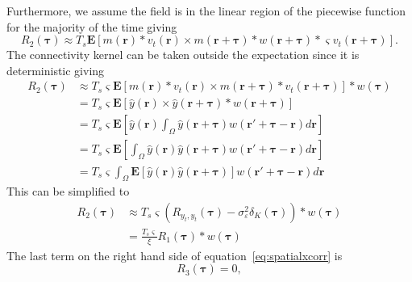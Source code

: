 \documentclass[]{article}
\begin{document}
Furthermore, we assume the field is in the linear region of the piecewise function for the majority of the time giving
\begin{equation}
	R_2(\boldsymbol{\tau}) \approx T_s\mathbf{E}\left[ m\left(\mathbf{r}\right) \ast v_t\left(\mathbf{r}\right) \times m\left(\mathbf{r}+\boldsymbol{\tau}\right) \ast w\left(\mathbf{r}+\boldsymbol{\tau}\right) \ast \varsigma v_t\left(\mathbf{r}+\boldsymbol{\tau}\right) \right].
\end{equation}
The connectivity kernel can be taken outside the expectation since it is deterministic giving
\begin{align}
	R_2(\boldsymbol{\tau}) &\approx T_s \varsigma \mathbf{E}\left[ m\left(\mathbf{r}\right) \ast v_t\left(\mathbf{r}\right) \times m\left(\mathbf{r}+\boldsymbol{\tau}\right)  \ast  v_t\left(\mathbf{r}+\boldsymbol{\tau}\right) \right] \ast w\left(\boldsymbol{\tau}\right) \\
	&= T_s \varsigma \mathbf{E}\left[ \hat{y}\left(\mathbf{r}\right) \times \hat{y}\left(\mathbf{r}+\boldsymbol{\tau}\right) \ast w\left(\mathbf{r}+\boldsymbol{\tau}\right)\right] \\
	&= T_s \varsigma \mathbf{E}\left[ \hat{y}\left(\mathbf{r}\right)  \int_{\Omega}\hat{y}\left(\mathbf{r}+\boldsymbol{\tau}\right) w\left(\mathbf{r}'+\boldsymbol{\tau}-\mathbf{r}\right) d\mathbf{r} \right] \\
	&= T_s \varsigma \mathbf{E}\left[  \int_{\Omega}\hat{y}\left(\mathbf{r}\right)\hat{y}\left(\mathbf{r}+\boldsymbol{\tau}\right) w\left(\mathbf{r}'+\boldsymbol{\tau}-\mathbf{r}\right) d\mathbf{r} \right] \\
	&= T_s \varsigma   \int_{\Omega}\mathbf{E}\left[\hat{y}\left(\mathbf{r}\right)\hat{y}\left(\mathbf{r}+\boldsymbol{\tau}\right) \right] w\left(\mathbf{r}'+\boldsymbol{\tau}-\mathbf{r}\right) d\mathbf{r}
\end{align}
This can be simplified to
\begin{align}
	R_2(\boldsymbol{\tau}) &\approx T_s \varsigma \left( R_{y_{t},y_{t}}(\boldsymbol{\tau}) - \sigma_{\varepsilon}^2 \delta_K\left(\boldsymbol{\tau}\right) \right) \ast w\left(\boldsymbol{\tau}\right) \\
	&= \frac{T_s \varsigma}{\xi} R_1(\boldsymbol{\tau}) \ast w\left(\boldsymbol{\tau}\right)
\end{align}
The last term on the right hand side of equation~\ref{eq:spatialxcorr} is
\begin{equation}
	R_3(\boldsymbol{\tau}) = 0,
\end{equation}
\end{document}
